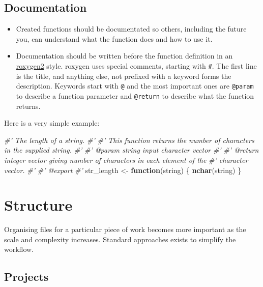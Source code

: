\documentclass[]{book}
\newenvironment{Shaded}{\begin{snugshade}}{\end{snugshade}}
\newcommand{\CommentTok}[1]{\textcolor[rgb]{0.56,0.35,0.01}{\textit{#1}}}
\newcommand{\ControlFlowTok}[1]{\textcolor[rgb]{0.13,0.29,0.53}{\textbf{#1}}}
\newcommand{\KeywordTok}[1]{\textcolor[rgb]{0.13,0.29,0.53}{\textbf{#1}}}
\newcommand{\NormalTok}[1]{#1}
\newcommand{\StringTok}[1]{\textcolor[rgb]{0.31,0.60,0.02}{#1}}
\providecommand{\tightlist}{%
  \setlength{\itemsep}{0pt}\setlength{\parskip}{0pt}}
\begin{document}
\hypertarget{documentation-1}{%
\subsection{Documentation}\label{documentation-1}}

\begin{itemize}
\tightlist
\item
  Created functions should be documentated so others, including the future you,
  can understand what the function does and how to use it.
\item
  Documentation should be written before the function definition in an
  \href{https://cran.r-project.org/web/packages/roxygen2/vignettes/markdown.html}{roxygen2}
  style. roxygen uses special comments, starting with \texttt{\#\textquotesingle{}}. The first line is the
  title, and anything else, not prefixed with a keyword forms the description.
  Keywords start with \texttt{@} and the most important ones are \texttt{@param} to describe
  a function parameter and \texttt{@return} to describe what the function returns.
\end{itemize}

Here is a very simple example:

\begin{Shaded}
\begin{Highlighting}[]
\CommentTok{#' The length of a string.}
\CommentTok{#'}
\CommentTok{#' This function returns the number of characters in the supplied string.}
\CommentTok{#' }
\CommentTok{#' @param string input character vector}
\CommentTok{#'}
\CommentTok{#' @return integer vector giving number of characters in each element of the}
\CommentTok{#'   character vector.}
\CommentTok{#'}
\CommentTok{#' @export}
\CommentTok{#'}
\NormalTok{str_length <-}\StringTok{ }\ControlFlowTok{function}\NormalTok{(string) \{}
  \KeywordTok{nchar}\NormalTok{(string)}
\NormalTok{\}}
\end{Highlighting}
\end{Shaded}

\hypertarget{structure}{%
\section{Structure}\label{structure}}

Organising files for a particular piece of work becomes more important as the scale and
complexity increases. Standard approaches exists to simplify the workflow.

\hypertarget{projects}{%
\subsection{Projects}\label{projects}}
\end{document}
